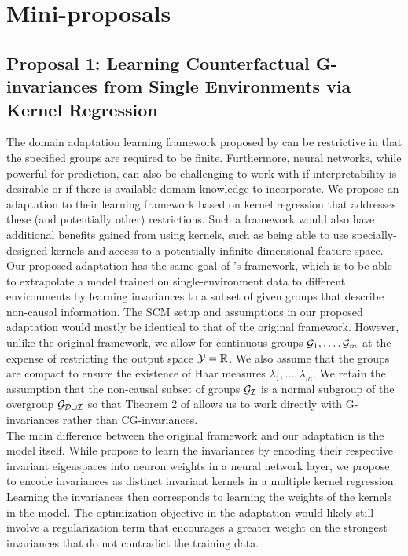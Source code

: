 

\section{Mini-proposals}

\subsection{Proposal 1: Learning Counterfactual G-invariances from Single Environments via Kernel Regression}

The domain adaptation learning framework proposed by \textcite{Mouli:2021} can be restrictive in that the specified groups are required to be finite. Furthermore, neural networks, while powerful for prediction, can also be challenging to work with if interpretability is desirable or if there is available domain-knowledge to incorporate. We propose an adaptation to their learning framework based on kernel regression that addresses these (and potentially other) restrictions. Such a framework would also have additional benefits gained from using kernels, such as being able to use specially-designed kernels and access to a potentially infinite-dimensional feature space.
\\

Our proposed adaptation has the same goal of \citeauthor{Mouli:2021}'s framework, which is to be able to extrapolate a model trained on single-environment data to different environments by learning invariances to a subset of given groups that describe non-causal information. The SCM setup and assumptions in our proposed adaptation would mostly be identical to that of the original framework. However, unlike the original framework, we allow for continuous groups $\mathcal{G}_1,\ldots,\mathcal{G}_m$ at the expense of restricting the output space $\mathcal{Y}=\mathbb{R}$. We also assume that the groups are compact to ensure the existence of Haar measures $\lambda_1,\ldots,\lambda_m$. We retain the assumption that the non-causal subset of groups $\mathcal{G}_{\mathcal{I}}$ is a normal subgroup of the overgroup $\mathcal{G}_{\mathcal{D}\cup\mathcal{I}}$ so that Theorem 2 of \parencite{Mouli:2021} allows us to work directly with G-invariances rather than CG-invariances.
\\

The main difference between the original framework and our adaptation is the model itself. While \citeauthor{Mouli:2021} propose to learn the invariances by encoding their respective invariant eigenspaces into neuron weights in a neural network layer, we propose to encode invariances as distinct invariant kernels in a multiple kernel regression. Learning the invariances then corresponds to learning the weights of the kernels in the model. The optimization objective in the adaptation would likely still involve a regularization term that encourages a greater weight on the strongest invariances that do not contradict the training data.
\\

